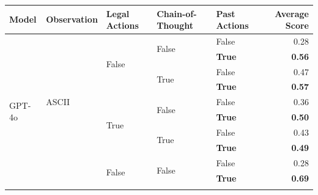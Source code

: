 \begin{tabular}{@{}lllllr@{}}
    \toprule
    \textbf{Model}              & \textbf{Observation}              & \textbf{Legal Actions}    & \textbf{Chain-of-Thought} & \textbf{Past Actions} & \textbf{Average Score} \\
    \midrule
    \multirow[c]{28}{*}{GPT-4o} & \multirow[c]{9}{*}{ASCII}         & \multirow[c]{4}{*}{False} & \multirow[c]{2}{*}{False} & False                 & 0.28 \\
                                &                                   &                           &                           & \textbf{True}         & \textbf{0.56} \\
    \cmidrule{4-6}                                  
                                &                                   &                           & \multirow[c]{2}{*}{True}  & False                 & 0.47 \\
                                &                                   &                           &                           & \textbf{True}         & \textbf{0.57} \\
    \cmidrule{3-6}                                  
                                &                                   & \multirow[c]{4}{*}{True}  & \multirow[c]{2}{*}{False} & False                 & 0.36 \\
                                &                                   &                           &                           & \textbf{True}         & \textbf{0.50} \\
    \cmidrule{4-6}                                  
                                &                                   &                           & \multirow[c]{2}{*}{True}  & False                 & 0.43 \\
                                &                                   &                           &                           & \textbf{True}         & \textbf{0.49} \\
    \cmidrule{2-6}                                  
                                & \multirow[c]{9}{*}{Coordinates}   & \multirow[c]{4}{*}{False} & \multirow[c]{2}{*}{False} & False                 & 0.28 \\
                                &                                   &                           &                           & \textbf{True}         & \textbf{0.69} \\
    \cmidrule{4-6}                                  

\end{tabular}

